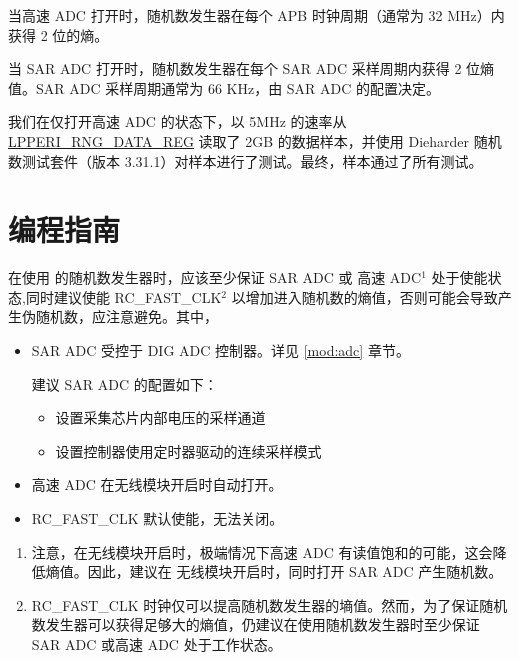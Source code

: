 \documentclass[main\_\_CN.tex]{subfiles}
\begin{document}
当高速 ADC 打开时，随机数发生器在每个 APB 时钟周期（通常为 32 MHz）内获得 2 位的熵。

当 SAR ADC 打开时，随机数发生器在每个 SAR ADC 采样周期内获得 2 位熵值。SAR ADC 采样周期通常为 66 KHz，由 SAR ADC 的配置决定。

我们在仅打开高速 ADC 的状态下，以 5MHz 的速率从\hyperref[regdesc:LPPERIRNGDATAREG]{LPPERI\_RNG\_DATA\_REG} 读取了 2GB 的数据样本，并使用 Dieharder 随机数测试套件（版本 3.31.1）对样本进行了测试。最终，样本通过了所有测试。

\section{编程指南}

在使用 \chipname{} 的随机数发生器时，应该至少保证 SAR ADC 或 高速 ADC\hyperref[others:rng-note-clock-seed]{$^1$} 处于使能状态,同时建议使能 RC\_FAST\_CLK\hyperref[others:rng-note-clock-seed]{$^2$} 以增加进入随机数的熵值，否则可能会导致产生伪随机数，应注意避免。其中，
\begin{itemize}
    \item SAR ADC 受控于 DIG ADC 控制器。详见 \ref{mod:adc} \textit{} 章节。

    建议 SAR ADC 的配置如下：
    \begin{itemize}
        \item 设置采集芯片内部电压的采样通道
         \item 设置控制器使用定时器驱动的连续采样模式
    \end{itemize}
    \item 高速 ADC 在无线模块开启时自动打开。
    \item RC\_FAST\_CLK 默认使能，无法关闭。


\end{itemize}
\begin{tiplisting}
\vspace{-2.5em}
\begin{enumerate}
    \label{others:rng-note-clock-seed}
    \item 注意，在无线模块开启时，极端情况下高速 ADC 有读值饱和的可能，这会降低熵值。因此，建议在 无线模块开启时，同时打开 SAR ADC 产生随机数。
    \item RC\_FAST\_CLK 时钟仅可以提高随机数发生器的墒值。然而，为了保证随机数发生器可以获得足够大的熵值，仍建议在使用随机数发生器时至少保证 SAR ADC 或高速 ADC 处于工作状态。
\end{enumerate}
\end{tiplisting}
\end{document}
